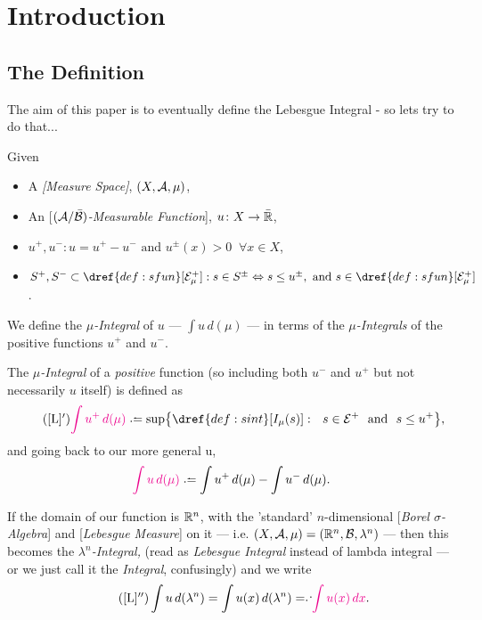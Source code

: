 \section{Introduction}
%
%
\subsection{The Definition}\label{def:main}
The aim of this paper is to eventually define the Lebesgue Integral - so lets try to do that...
\begin{definition}
	Given
%
	\begin{itemize}
		\item A \emph{[Measure Space]}, $(X, \mathcal{A}, \mu)$,
		\item An [$(\mathcal{A}/\bar {\mathcal{B}})$\emph{-Measurable Function}], $u\colon X \rightarrow \bar {\mathbb{R}}$,
		\item $u^+, u^- : u = u^+ - u^- \text{ and }u^{\pm}(x) > 0 \;\; \forall x \in X$,  
		\item $S^+, S^- \subset \dref{def:sfun}[\E_\mu^+] : s \in S^{\pm} \Leftrightarrow s \leq u^{\pm}, \text{ and } s \in \dref{def:sfun}[\E^+_\mu]$.
	\end{itemize}
%
	We define the {\color{Magenta}\emph{$\mu$-Integral}} of $u$ --- $\int u\,d(\mu)$ --- in terms of the {\color{Magenta}\emph{$\mu$-Integrals}}
	of the positive functions $u^+$ and $u^-$. 

	The {\color{Magenta}\emph{$\mu$-Integral}} of a {\em positive} function (so including both $u^-$ and $u^+$ but not necessarily $u$ itself) is defined as
%
	\begin{equation*}\label{posint}\tag{\ref{L}$'$}
	{\color{Magenta}\int u^+\,d(\mu)} \defeq \sup\bigr\{ \dref{def:sint}[I_\mu(s)] : \ \  s \in \E^+ \text{ \ and \ } s \le u^+ \bigl\},
	\end{equation*}
%
	and going back to our more general u, 
%
	\begin{equation}\label{L}
	{\color{Magenta}\int u\,d(\mu)} \defeq \int u^+\,d(\mu) - \int u^-\,d(\mu).
	\end{equation}

	If the domain of our function is $\mathbb{R}^n$, with the 'standard' $n$-dimensional [\emph{Borel $\sigma$-Algebra}] and 
	[\emph{Lebesgue Measure}] on it --- i.e. $(X, \mathcal{A}, \mu) = (\mathbb{R}^n, \mathcal{B}, \lambda^n)$ --- then this becomes the {\color{Magenta}\emph{$\lambda^n$-Integral,}}
	 (read as {\it \color{Magenta}Lebesgue Integral} instead of lambda integral --- or we just call it the {\color{Magenta}\emph{Integral}}, confusingly) and we write
%
	\begin{equation*} \tag{\ref{L}$''$}
	\int u\,d(\lambda^n) =  \int u(x)\,d(\Ln) \eqdef {\color{Magenta}\int u(x)\,dx}. 
	\end{equation*}
	\vskip 5pt
\end{definition}


